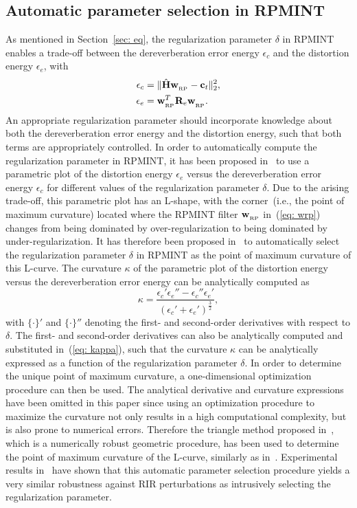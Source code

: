 \documentclass[10pt]{IEEEtran}
\begin{document}
\subsection{Automatic parameter selection in RPMINT}
\label{sec: auto_rpmint}
As mentioned in Section~\ref{sec: eq}, the regularization parameter $\delta$ in RPMINT enables a trade-off between the dereverberation error energy $\epsilon_c$ and the distortion energy $\epsilon_e$, with
\begin{align}
\epsilon_c  &= \|\hat{\mathbf{H}}\mathbf{w}_{_{\rm RP}} -\mathbf{c}_t \|_2^2, \\
\epsilon_e &= \mathbf{w}_{_{\rm RP}}^T\mathbf{R}_{e}\mathbf{w}_{_{\rm RP}}^{}.
\end{align}
{{An appropriate regularization parameter should incorporate knowledge about both the dereverberation error energy and the distortion energy, such that both terms are appropriately controlled.}}
In order to automatically compute the regularization parameter in RPMINT, it has been proposed in~\cite{Kodrasi_ITASLP_2013} to use a parametric plot of the distortion energy $\epsilon_e$ versus the dereverberation error energy $\epsilon_c$ for different values of the regularization parameter $\delta$.
Due to the arising trade-off, this parametric plot has an L-shape, with the corner~(i.e., the point of maximum curvature) located where the RPMINT filter $\mathbf{w}_{_{\rm RP}}$ in~(\ref{eq: wrp}) changes from being dominated by over-regularization to being dominated by under-regularization.
It has therefore been proposed in~\cite{Kodrasi_ITASLP_2013} to automatically select the regularization parameter $\delta$ in RPMINT as the point of maximum curvature of this L-curve.
{{The curvature $\kappa$ of the parametric plot of the distortion energy versus the dereverberation error energy can be analytically computed as~\cite{Hansen_1993}
\begin{equation}
\label{eq: kappa}
\kappa = \frac{\epsilon_c'\epsilon_e'' - \epsilon_c''\epsilon_e' }{(\epsilon_c' + \epsilon_e')^{\frac{3}{2}}},
\end{equation}
with $\{\cdot\}'$ and $\{\cdot\}''$ denoting the first- and second-order derivatives with respect to $\delta$.
The first- and second-order derivatives can also be analytically computed and substituted in~(\ref{eq: kappa}), such that the curvature $\kappa$ can be analytically expressed as a function of the regularization parameter $\delta$.
In order to determine the unique point of maximum curvature, a one-dimensional optimization procedure can then be used.
The analytical derivative and curvature expressions have been omitted in this paper since using an optimization procedure to maximize the curvature not only results in a high computational complexity, but is also prone to numerical errors.
Therefore the triangle method proposed in~\cite{Castellanos_2002}, which is a numerically robust geometric procedure, has been used to determine the point of maximum curvature of the L-curve, similarly as in~\cite{Kodrasi_ITASLP_2013}.}}
Experimental results in~\cite{Kodrasi_ITASLP_2013} have shown that this automatic parameter selection procedure yields a very similar robustness against RIR perturbations as intrusively selecting the regularization parameter.
\end{document}

